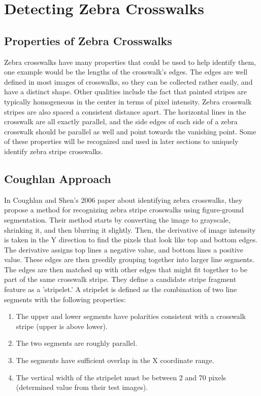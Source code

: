 \chapter{Detecting Zebra Crosswalks}

\section{Properties of Zebra Crosswalks}

Zebra crosswalks have many properties that could be used to help identify them, one example would be the lengths of the crosswalk's edges. The edges are well defined in most images of crosswalks, so they can be collected rather easily, and have a distinct shape. Other qualities include the fact that painted stripes are typically homogeneous in the center in terms of pixel intensity. Zebra crosswalk stripes are also spaced a consistent distance apart. The horizontal lines in the crosswalk are all exactly parallel, and the side edges of each side of a zebra crosswalk should be parallel as well and point towards the vanishing point. Some of these properties will be recognized and used in later sections to uniquely identify zebra stripe crosswalks. 

\section{Coughlan Approach}
In Coughlan and Shen's 2006 paper \cite{Coughlan2006} about identifying zebra crosswalks, they propose a method for recognizing zebra stripe crosswalks using figure-ground segmentation.  Their method starts by converting the image to grayscale, shrinking it, and then blurring it slightly. Then, the derivative of image intensity is taken in the Y direction to find the pixels that look like top and bottom edges. The derivative assigns top lines a negative value, and bottom lines a positive value.  These edges are then greedily grouping together into larger line segments. The edges are then matched up with other edges that might fit together to be part of the same crosswalk stripe. They define a candidate stripe fragment feature as a 'stripelet.' A stripelet is defined as the combination of two line segments with the following properties: 
\begin{enumerate}
  \item The upper and lower segments have polarities consistent with a crosswalk stripe (upper is above lower).
  \item The two segments are roughly parallel.
  \item The segments have sufficient overlap in the X coordinate range.
  \item The vertical width of the stripelet must be between 2 and 70 pixels (determined value from their test images).
\end{enumerate}

